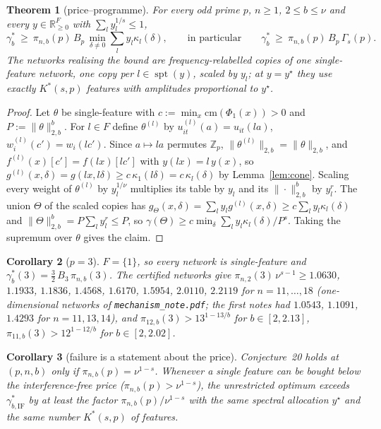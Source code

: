 \documentclass[11pt]{article}
\newtheorem{theorem}{Theorem}
\newtheorem{corollary}[theorem]{Corollary}
\theoremstyle{definition}
\begin{document}
\begin{theorem}[price--programme]\label{thm:pp}
For every odd prime $p$, $n\ge1$, $2\le b\le\nu$ and every $y\in\mathbb R^F_{\ge0}$ with $\sum_ly_l^{1/s}\le1$,
\[
\gamma^*_b\ \ge\ \pi_{n,b}(p)\,B_p\,\min_{\delta\ne0}\sum_{l}y_l\kappa_l(\delta),\qquad\text{in particular}\qquad
\gamma^*_b\ \ge\ \pi_{n,b}(p)\,B_p\,\Gamma_s(p).
\]
The networks realising the bound are frequency-relabelled copies of one single-feature network, one copy per
$l\in\operatorname{spt}(y)$, scaled by $y_l$; at $y=y^\star$ they use exactly $K^*(s,p)$ features with amplitudes
proportional to $y^\star$.
\end{theorem}
\begin{proof}
Let $\theta$ be single-feature with $c:=\min_x\mathrm{cm}(\Phi_1(x))>0$ and $P:=\|\theta\|^b_{2,b}$.  For $l\in F$ define
$\theta^{(l)}$ by $u^{(l)}_{it}(a)=u_{it}(la)$, $w^{(l)}_i(c')=w_i(lc')$.  Since $a\mapsto la$ permutes $\mathbb Z_p$,
$\|\theta^{(l)}\|_{2,b}=\|\theta\|_{2,b}$, and $f^{(l)}(x)[c']=f(lx)[lc']$ with $y(lx)=l\,y(x)$, so
$g^{(l)}(x,\delta)=g(lx,l\delta)\ge c\,\kappa_1(l\delta)=c\,\kappa_l(\delta)$ by Lemma~\ref{lem:cone}.
Scaling every weight of $\theta^{(l)}$ by $y_l^{1/\nu}$ multiplies its table by $y_l$ and its $\|\cdot\|^b_{2,b}$ by
$y_l^{r}$.  The union $\Theta$ of the scaled copies has $g_\Theta(x,\delta)=\sum_ly_lg^{(l)}(x,\delta)\ge
c\sum_ly_l\kappa_l(\delta)$ and $\|\Theta\|^b_{2,b}=P\sum_ly_l^r\le P$, so
$\gamma(\Theta)\ge c\min_\delta\sum_ly_l\kappa_l(\delta)/P^{s}$.  Taking the supremum over $\theta$ gives the claim.
\end{proof}

\begin{corollary}[$p=3$]\label{cor:p3}
$F=\{1\}$, so every network is single-feature and $\gamma^*_b(3)=\tfrac32\,B_3\,\pi_{n,b}(3)$.  The certified
networks give $\pi_{n,2}(3)\,\nu^{s-1}\ge1.0630$, $1.1933$, $1.1836$, $1.4568$, $1.6170$, $1.5954$, $2.0110$, $2.2119$ for
$n=11,\dots,18$ (one-dimensional networks of \texttt{mechanism\_note.pdf}; the first notes had $1.0543$, $1.1091$,
$1.4293$ for $n=11,13,14$), and $\pi_{12,b}(3)>13^{1-13/b}$ for $b\in[2,2.13]$,
$\pi_{11,b}(3)>12^{1-12/b}$ for $b\in[2,2.02]$.
\end{corollary}

\begin{corollary}[failure is a statement about the price]\label{cor:transfer}
Conjecture~20 holds at $(p,n,b)$ only if $\pi_{n,b}(p)=\nu^{1-s}$.  Whenever a single feature can be bought below the
interference-free price ($\pi_{n,b}(p)>\nu^{1-s}$), the unrestricted optimum exceeds $\gamma^*_{b,\mathrm{IF}}$ by at least the
factor $\pi_{n,b}(p)/\nu^{1-s}$ \emph{with the same spectral allocation $y^\star$ and the same number $K^*(s,p)$ of
features}.
\end{corollary}
\end{document}

